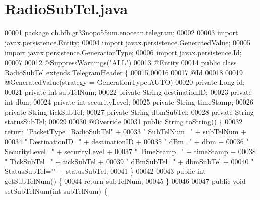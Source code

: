 \section{Radio\+Sub\+Tel.\+java}
\label{RadioSubTel_8java_source}

\begin{DoxyCode}
00001 \textcolor{keyword}{package }ch.bfh.gr33nopo55um.enocean.telegram;
00002 
00003 \textcolor{keyword}{import} javax.persistence.Entity;
00004 \textcolor{keyword}{import} javax.persistence.GeneratedValue;
00005 \textcolor{keyword}{import} javax.persistence.GenerationType;
00006 \textcolor{keyword}{import} javax.persistence.Id;
00007 
00012 @SuppressWarnings(\textcolor{stringliteral}{"ALL"})
00013 @Entity
00014 \textcolor{keyword}{public} \textcolor{keyword}{class }RadioSubTel \textcolor{keyword}{extends} TelegramHeader \{
00015 
00016 
00017     @Id
00018 
00019     @GeneratedValue(strategy = GenerationType.AUTO)
00020     private Long \textcolor{keywordtype}{id};
00021     private \textcolor{keywordtype}{int} subTelNum;
00022     private String destinationID;
00023     private \textcolor{keywordtype}{int} dbm;
00024     private \textcolor{keywordtype}{int} securityLevel;
00025     private String timeStamp;
00026     private String tickSubTel;
00027     private String dbmSubTel;
00028     private String statusSubTel;
00029 
00030     @Override
00031     public String toString() \{
00032         \textcolor{keywordflow}{return} \textcolor{stringliteral}{"PacketType=RadioSubTel"} +
00033                 \textcolor{stringliteral}{" SubTelNum="} + subTelNum +
00034                 \textcolor{stringliteral}{" DestinationID="} + destinationID +
00035                 \textcolor{stringliteral}{" dBm="} + dbm +
00036                 \textcolor{stringliteral}{" SecurityLevel="} + securityLevel +
00037                 \textcolor{stringliteral}{" TimeStamp="} + timeStamp +
00038                 \textcolor{stringliteral}{" TickSubTel="} + tickSubTel +
00039                 \textcolor{stringliteral}{" dBmSubTel="} + dbmSubTel +
00040                 \textcolor{stringliteral}{" StatusSubTel='"} + statusSubTel;
00041     \}
00042 
00043     \textcolor{keyword}{public} \textcolor{keywordtype}{int} getSubTelNum() \{
00044         \textcolor{keywordflow}{return} subTelNum;
00045     \}
00046 
00047     \textcolor{keyword}{public} \textcolor{keywordtype}{void} setSubTelNum(\textcolor{keywordtype}{int} subTelNum) \{

\end{DoxyCode}
